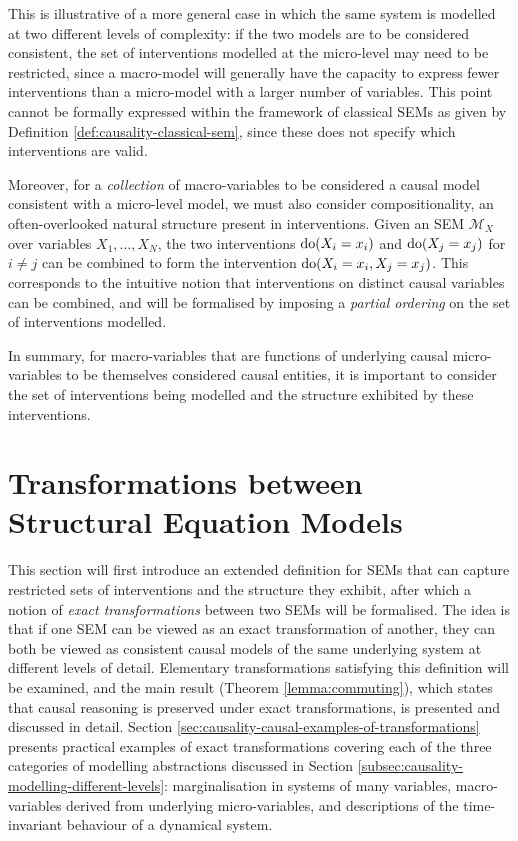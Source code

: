 This is illustrative of a more general case in which the same system is modelled at two different levels of complexity: if the two models are to be considered consistent, the set of interventions modelled at the micro-level may need to be restricted, since a macro-model will generally have the capacity to express fewer interventions than a micro-model with a larger number of variables. 
This point cannot be formally expressed within the framework of classical SEMs as given by Definition \ref{def:causality-classical-sem}, since these does not specify which interventions are valid. 

Moreover, for a \emph{collection} of macro-variables to be considered a causal model consistent with a micro-level model, we must also consider compositionality, an often-overlooked natural structure present in interventions.
Given an SEM $\mathcal{M}_X$ over variables $X_1, \ldots, X_N$, the two interventions $\operatorname{do}(X_i=x_i)$ and $\operatorname{do}(X_j=x_j)$ for $i\not=j$  can be combined to form the intervention $\operatorname{do}(X_i=x_i, X_j=x_j)$. 
This corresponds to the intuitive notion that interventions on distinct causal variables can be combined, and will be formalised by imposing a \emph{partial ordering} on the set of interventions modelled.

In summary, for macro-variables that are functions of underlying causal micro-variables to be themselves considered causal entities, it is important to consider the set of interventions being modelled and the structure exhibited by these interventions.


\section{Transformations between Structural Equation Models}\label{sec:causality-transformations-between-sems}

This section will first introduce an extended definition for SEMs that can capture restricted sets of interventions and the structure they exhibit, after which a notion of \emph{exact transformations} between two SEMs will be formalised. 
The idea is that if one SEM can be viewed as an exact transformation of another, they can both be viewed as consistent causal models of the same underlying system at different levels of detail. 
Elementary transformations satisfying this definition will be examined, and the main result (Theorem \ref{lemma:commuting}), which states that causal reasoning is preserved under exact transformations, is presented and discussed in detail.
Section \ref{sec:causality-causal-examples-of-transformations} presents practical examples of exact transformations covering each of the three categories of modelling abstractions discussed in Section \ref{subsec:causality-modelling-different-levels}: marginalisation in systems of many variables, macro-variables derived from underlying micro-variables, and descriptions of the time-invariant behaviour of a dynamical system.


